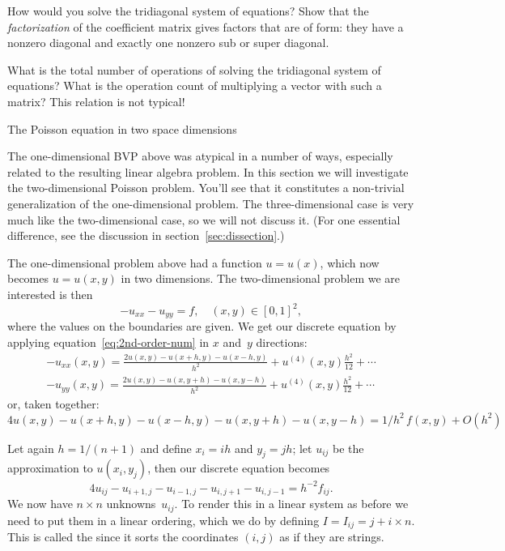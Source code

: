\begin{exercise}
  \label{ex:solve-tri}
  How would you solve the tridiagonal
  system of equations? Show that the \emph{factorization}%
  of the coefficient matrix gives factors that are of
   form: they have a nonzero diagonal
  and exactly one nonzero sub or super diagonal.

  What is the total number of operations of solving the tridiagonal
  system of equations? What is the operation count of multiplying a
  vector with
  such a matrix? This relation is not typical!
\end{exercise}

 {The Poisson equation in two space dimensions}
\label{sec:2dbvp}

The one-dimensional \ac{BVP} above was atypical in a number of ways,
especially related to the resulting linear algebra problem. In this
section we will investigate the two-dimensional Poisson problem.
You'll see that it constitutes a non-trivial generalization of the one-dimensional problem.
The three-dimensional case is very much like the two-dimensional case,
so we will not discuss it. (For one essential difference, see the discussion
in section~\ref{sec:dissection}.)

The one-dimensional problem above had a function $u=u(x)$, which now becomes
$u=u(x,y)$ in two dimensions. 
The two-dimensional problem we are interested is then
\begin{equation} -u_{xx}-u_{yy} = f,\quad (x,y)\in[0,1]^2,
  \label{eq:laplace}
\end{equation}
where the values on the boundaries are given. We get our discrete
equation by applying equation~\eqref{eq:2nd-order-num} in $x$ and~$y$
directions:
\[
\begin{array}{l}
  -u_{xx}(x,y)=\frac{2u(x,y)-u(x+h,y)-u(x-h,y)}{h^2}+u^{(4)}(x,y)\frac{h^2}{12}+\cdots\\
  -u_{yy}(x,y)=\frac{2u(x,y)-u(x,y+h)-u(x,y-h)}{h^2}+u^{(4)}(x,y)\frac{h^2}{12}+\cdots
\end{array}
\]
or, taken together:
\begin{equation}
  4u(x,y)-u(x+h,y)-u(x-h,y)-u(x,y+h)-u(x,y-h)=1/h^2\,f(x,y)+O(h^2)
  \label{eq:5-point-star}
\end{equation}

Let again $h=1/(n+1)$ and
define $x_i=ih$ and $y_j=jh$; let $u_{ij}$ be the approximation to
$u(x_i,y_j)$, then
our discrete equation becomes
\begin{equation}
  4u_{ij}-u_{i+1,j}-u_{i-1,j}-u_{i,j+1}-u_{i,j-1}=h^{-2}f_{ij}.
  \label{eq:5-point-star-ij}
\end{equation}
We now have $n\times n$ unknowns~$u_{ij}$. To render this in a linear
system as before we need to put them in a linear ordering, which we do
by defining $I=I_{ij}=j+i\times n$. This is called the
 since it sorts the coordinates
$(i,j)$ as if they are strings.


